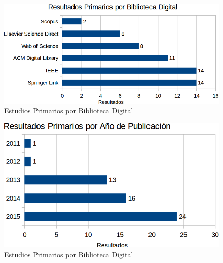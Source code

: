 \documentclass{report}
\begin{document}
            \begin{figure}
        		\begin{center}
        			\includegraphics[scale=0.45]{images/1document/PrimariosBD.png}
        			\caption{Estudios Primarios por Biblioteca Digital}
		        	\label{primariosLibrary}
           		\end{center}
        	\end{figure}
        	
            \begin{figure}
        		\begin{center}
        			\includegraphics[scale=0.45]{images/1document/PrimariosAnio.png}
        			\caption{Estudios Primarios por Biblioteca Digital}
		        	\label{primariosGrafica}
           		\end{center}
        	\end{figure}
        	
\end{document}
